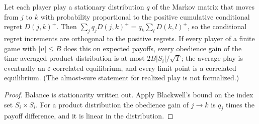 \begin{theorem}
\label{thm:beh-conditional-regret}
\leanok
{}
Let each player play a stationary distribution $q$ of the Markov matrix that moves from $j$ to $k$ with probability
proportional to the positive cumulative conditional regret $D(j,k)^+$. Then $\sum_jq_jD(j,k)^+=q_k\sum_lD(k,l)^+$, so
the conditional regret increments are orthogonal to the positive regrets. If every player of a finite game with
$|u|\le B$ does this on expected payoffs, every obedience gain of the time-averaged product distribution is at most
$2B|S_i|/\sqrt T$; the average play is eventually an $\varepsilon$-correlated equilibrium, and every limit point is a
correlated equilibrium. (The almost-sure statement for realized play is not formalized.)
\end{theorem}
\begin{proof}
\leanok
Balance is stationarity written out. Apply Blackwell's bound on the index set $S_i\times S_i$. For a product
distribution the obedience gain of $j\to k$ is $q_j$ times the payoff difference, and it is linear in the distribution.
\end{proof}

